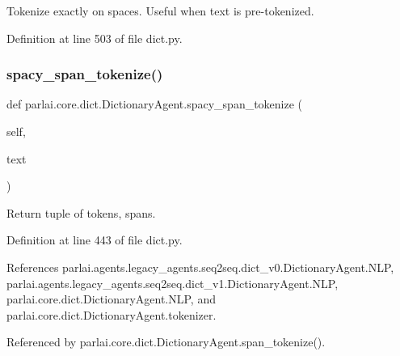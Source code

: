 \begin{DoxyVerb}Tokenize exactly on spaces. Useful when text is pre-tokenized.\end{DoxyVerb}
 

Definition at line 503 of file dict.\+py.

\mbox{\label{classparlai_1_1core_1_1dict_1_1DictionaryAgent_a6532e92a69be5a68d04963597cd4ba29}} 
\subsubsection{\texorpdfstring{spacy\+\_\+span\+\_\+tokenize()}{spacy\_span\_tokenize()}}
{\footnotesize\ttfamily def parlai.\+core.\+dict.\+Dictionary\+Agent.\+spacy\+\_\+span\+\_\+tokenize (\begin{DoxyParamCaption}\item[{}]{self,  }\item[{}]{text }\end{DoxyParamCaption})}

\begin{DoxyVerb}Return tuple of tokens, spans.\end{DoxyVerb}
 

Definition at line 443 of file dict.\+py.



References parlai.\+agents.\+legacy\+\_\+agents.\+seq2seq.\+dict\+\_\+v0.\+Dictionary\+Agent.\+N\+LP, parlai.\+agents.\+legacy\+\_\+agents.\+seq2seq.\+dict\+\_\+v1.\+Dictionary\+Agent.\+N\+LP, parlai.\+core.\+dict.\+Dictionary\+Agent.\+N\+LP, and parlai.\+core.\+dict.\+Dictionary\+Agent.\+tokenizer.



Referenced by parlai.\+core.\+dict.\+Dictionary\+Agent.\+span\+\_\+tokenize().

